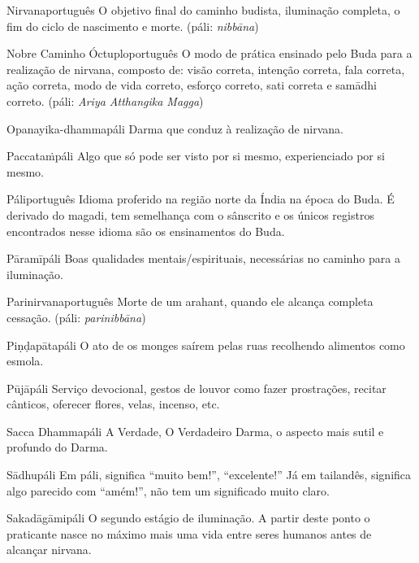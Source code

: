 \begin{glossarydescription}
  \item[{{Nirvana}{português}}] O objetivo final do caminho budista, iluminação completa, o fim do ciclo de nascimento e morte. (páli: \emph{nibbāna})

  \item[{{Nobre Caminho Óctuplo}{português}}] O modo de prática ensinado pelo Buda para a realização de nirvana, composto de: visão correta, intenção correta, fala correta, ação correta, modo de vida correto, esforço correto, sati correta e samādhi correto. (páli: \emph{Ariya Atthangika Magga})

  \item[{{Opanayika-dhamma}{páli}}] Darma que conduz à realização de nirvana.

  \item[{{Paccataṁ}{páli}}] Algo que só pode ser visto por si mesmo, experienciado por si mesmo.

  \item[{{Páli}{português}}] Idioma proferido na região norte da Índia na época do Buda. É derivado do magadi, tem semelhança com o sânscrito e os únicos registros encontrados nesse idioma são os ensinamentos do Buda.

  \item[{{Pāramī}{páli}}] Boas qualidades mentais/espirituais, necessárias no caminho para a iluminação.

  \item[{{Parinirvana}{português}}] Morte de um arahant, quando ele alcança completa cessação. (páli: \emph{parinibbāna})

  \item[{{Piṇḍapāta}{páli}}] O ato de os monges saírem pelas ruas recolhendo alimentos como esmola.

  \item[{{Pūjā}{páli}}] Serviço devocional, gestos de louvor como fazer prostrações, recitar cânticos, oferecer flores, velas, incenso, etc.

  \item[{{Sacca Dhamma}{páli}}] A Verdade, O Verdadeiro Darma, o aspecto mais sutil e profundo do Darma.

  \item[{{Sādhu}{páli}}] Em páli, significa “muito bem!”, “excelente!” Já em tailandês, significa algo parecido com “amém!”, não tem um significado muito claro.

  \item[{{Sakadāgāmi}{páli}}] O segundo estágio de iluminação. A partir deste ponto o praticante nasce no máximo mais uma vida entre seres humanos antes de alcançar nirvana.


\end{glossarydescription}
